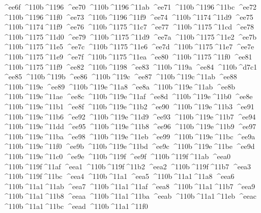 \checkit ^^^^ee6f ^^^^110b^^^^1196
\checkit ^^^^ee70 ^^^^110b^^^^1196^^^^11ab
\checkit ^^^^ee71 ^^^^110b^^^^1196^^^^11bc
\checkit ^^^^ee72 ^^^^110b^^^^1196^^^^11f0
\checkit ^^^^ee73 ^^^^110b^^^^1196^^^^11f9
\checkit ^^^^ee74 ^^^^110b^^^^1174^^^^11d9
\checkit ^^^^ee75 ^^^^110b^^^^1174^^^^11f9
\checkit ^^^^ee76 ^^^^110b^^^^1175^^^^11c7
\checkit ^^^^ee77 ^^^^110b^^^^1175^^^^11cd
\checkit ^^^^ee78 ^^^^110b^^^^1175^^^^11d0
\checkit ^^^^ee79 ^^^^110b^^^^1175^^^^11d9
\checkit ^^^^ee7a ^^^^110b^^^^1175^^^^11e2
\checkit ^^^^ee7b ^^^^110b^^^^1175^^^^11e5
\checkit ^^^^ee7c ^^^^110b^^^^1175^^^^11e6
\checkit ^^^^ee7d ^^^^110b^^^^1175^^^^11e7
\checkit ^^^^ee7e ^^^^110b^^^^1175^^^^11e9
\checkit ^^^^ee7f ^^^^110b^^^^1175^^^^11ea
\checkit ^^^^ee80 ^^^^110b^^^^1175^^^^11f0
\checkit ^^^^ee81 ^^^^110b^^^^1175^^^^11f9
\checkit ^^^^ee82 ^^^^110b^^^^1198
\checkit ^^^^ee83 ^^^^110b^^^^119a
\checkit ^^^^ee84 ^^^^110b^^^^d7c1
\checkit ^^^^ee85 ^^^^110b^^^^119b
\checkit ^^^^ee86 ^^^^110b^^^^119c
\checkit ^^^^ee87 ^^^^110b^^^^119c^^^^11ab
\checkit ^^^^ee88 ^^^^110b^^^^119e
\checkit ^^^^ee89 ^^^^110b^^^^119e^^^^11a8
\checkit ^^^^ee8a ^^^^110b^^^^119e^^^^11ab
\checkit ^^^^ee8b ^^^^110b^^^^119e^^^^11ae
\checkit ^^^^ee8c ^^^^110b^^^^119e^^^^11af
\checkit ^^^^ee8d ^^^^110b^^^^119e^^^^11b0
\checkit ^^^^ee8e ^^^^110b^^^^119e^^^^11b1
\checkit ^^^^ee8f ^^^^110b^^^^119e^^^^11b2
\checkit ^^^^ee90 ^^^^110b^^^^119e^^^^11b3
\checkit ^^^^ee91 ^^^^110b^^^^119e^^^^11b6
\checkit ^^^^ee92 ^^^^110b^^^^119e^^^^11d9
\checkit ^^^^ee93 ^^^^110b^^^^119e^^^^11b7
\checkit ^^^^ee94 ^^^^110b^^^^119e^^^^11dd
\checkit ^^^^ee95 ^^^^110b^^^^119e^^^^11b8
\checkit ^^^^ee96 ^^^^110b^^^^119e^^^^11b9
\checkit ^^^^ee97 ^^^^110b^^^^119e^^^^11ba
\checkit ^^^^ee98 ^^^^110b^^^^119e^^^^11eb
\checkit ^^^^ee99 ^^^^110b^^^^119e^^^^11bc
\checkit ^^^^ee9a ^^^^110b^^^^119e^^^^11f0
\checkit ^^^^ee9b ^^^^110b^^^^119e^^^^11bd
\checkit ^^^^ee9c ^^^^110b^^^^119e^^^^11be
\checkit ^^^^ee9d ^^^^110b^^^^119e^^^^11c0
\checkit ^^^^ee9e ^^^^110b^^^^119f
\checkit ^^^^ee9f ^^^^110b^^^^119f^^^^11ab
\checkit ^^^^eea0 ^^^^110b^^^^119f^^^^11af
\checkit ^^^^eea1 ^^^^110b^^^^119f^^^^11b2
\checkit ^^^^eea2 ^^^^110b^^^^119f^^^^11b7
\checkit ^^^^eea3 ^^^^110b^^^^119f^^^^11bc
\checkit ^^^^eea4 ^^^^110b^^^^11a1
\checkit ^^^^eea5 ^^^^110b^^^^11a1^^^^11a8
\checkit ^^^^eea6 ^^^^110b^^^^11a1^^^^11ab
\checkit ^^^^eea7 ^^^^110b^^^^11a1^^^^11af
\checkit ^^^^eea8 ^^^^110b^^^^11a1^^^^11b7
\checkit ^^^^eea9 ^^^^110b^^^^11a1^^^^11b8
\checkit ^^^^eeaa ^^^^110b^^^^11a1^^^^11ba
\checkit ^^^^eeab ^^^^110b^^^^11a1^^^^11eb
\checkit ^^^^eeac ^^^^110b^^^^11a1^^^^11bc
\checkit ^^^^eead ^^^^110b^^^^11a1^^^^11f0
